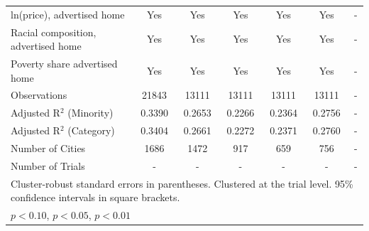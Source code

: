 \begin{table}[htbp]
{\begin{tabular}{l*{6}{c}}
ln(price), advertised home  & Yes & Yes & Yes & Yes & Yes & - \\
Racial composition, advertised home & Yes & Yes & Yes & Yes & Yes & - \\
Poverty share advertised home & Yes & Yes & Yes & Yes & Yes & - \\
Observations & 21843 & 13111 & 13111 & 13111 & 13111 & - \\
Adjusted R$^2$ (Minority) & 0.3390 & 0.2653 & 0.2266 & 0.2364 & 0.2756 & - \\
Adjusted R$^2$ (Category) & 0.3404 & 0.2661 & 0.2272 & 0.2371 & 0.2760 & - \\
Number of Cities & 1686 & 1472 & 917 & 659 & 756 & - \\
Number of Trials & - & - & - & - & - & - \\
\bottomrule
\multicolumn{7}{l}{\footnotesize Cluster-robust standard errors in parentheses. Clustered at the trial level. 95\% confidence intervals in square brackets.}\\
\multicolumn{7}{l}{\footnotesize \sym{*} \(p<0.10\), \sym{**} \(p<0.05\), \sym{***} \(p<0.01\)}\\
\end{tabular}
}
\end{table}
